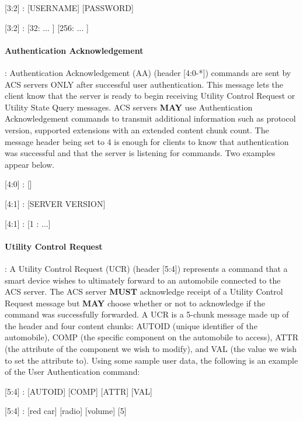 \begin{center}
{\textsf{[3:2] : [USERNAME] [PASSWORD]}}

{\textsf{[3:2] : [32: ... ] [256: ... ]}}
\end{center}

\paragraph{Authentication Acknowledgement}: Authentication Acknowledgement (AA) (header [4:0-*]) commands are sent by ACS servers ONLY after successful user authentication. This message lets the client know that the server is ready to begin receiving Utility Control Request or Utility State Query messages. ACS servers \textbf{MAY} use Authentication Acknowledgement commands to transmit additional information such as protocol version, supported extensions with an extended content chunk count. The message header being set to 4 is enough for clients to know that authentication was successful and that the server is listening for commands. Two examples appear below.

\begin{center}
{\textsf{[4:0] : []}}

{\textsf{[4:1] : [SERVER VERSION]}}

{\textsf{[4:1] : [1 : ...]}}
\end{center}

\paragraph{Utility Control Request}: A Utility Control Request (UCR) (header [5:4]) represents a command that a smart device wishes to ultimately forward to an automobile connected to the ACS server. The ACS server \textbf{MUST} acknowledge receipt of a Utility Control Request message but \textbf{MAY} choose whether or not to acknowledge if the command was successfully forwarded. A UCR is a 5-chunk message made up of the header and four content chunks: AUTOID (unique identifier of the automobile), COMP (the specific component on the automobile to access), ATTR (the attribute of the component we wish to modify), and VAL (the value we wish to set the attribute to). Using some sample user data, the following is an example of the User Authentication command:

\begin{center}
{\textsf{[5:4] : [AUTOID] [COMP] [ATTR] [VAL]}}

{\textsf{[5:4] : [red car] [radio] [volume] [5]}}
\end{center}

